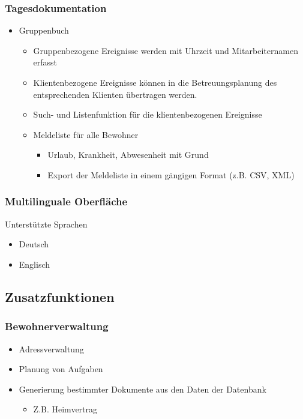 \documentclass[a4paper,10pt]{article}
\begin{document}
\subsubsection{Tagesdokumentation}
\begin{itemize}
	\item Gruppenbuch
	\begin{itemize}
		\item Gruppenbezogene Ereignisse werden mit Uhrzeit und Mitarbeiternamen erfasst
		\item Klientenbezogene Ereignisse können in die Betreuungsplanung des entsprechenden Klienten übertragen werden.
		\item Such- und Listenfunktion für die klientenbezogenen Ereignisse
		\item Meldeliste für alle Bewohner
		\begin{itemize}
			\item Urlaub, Krankheit, Abwesenheit mit Grund
			\item Export der Meldeliste in einem gängigen Format (z.B. CSV, XML)
		\end{itemize}
	\end{itemize}
\end{itemize}
\subsubsection{Multilinguale Oberfläche}
Unterstützte Sprachen
\begin{itemize}
	\item Deutsch
	\item Englisch
\end{itemize}
\subsection{Zusatzfunktionen}
\subsubsection{Bewohnerverwaltung}
\begin{itemize}
	\item Adressverwaltung
	\item Planung von Aufgaben
	\item Generierung bestimmter Dokumente aus den Daten der Datenbank
	\begin{itemize}
		\item Z.B. Heimvertrag
	\end{itemize}
\end{itemize}
\end{document}
